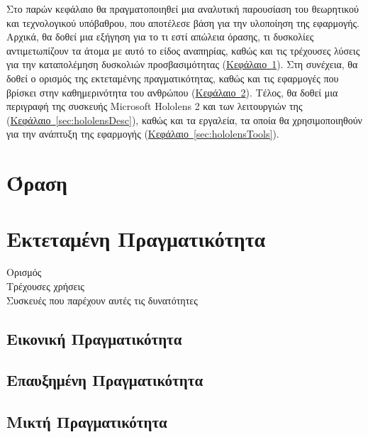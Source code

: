 
Στο παρών κεφάλαιο θα πραγματοποιηθεί μια αναλυτική παρουσίαση του θεωρητικού και τεχνολογικού υπόβαθρου, που αποτέλεσε βάση για την υλοποίηση της εφαρμογής. Αρχικά, θα δοθεί μια εξήγηση για το τι εστί απώλεια όρασης, τι δυσκολίες αντιμετωπίζουν τα άτομα με αυτό το είδος αναπηρίας, καθώς και τις τρέχουσες λύσεις για την καταπολέμηση δυσκολιών προσβασιμότητας (\hyperref[sec:visualImpairment]{Κεφάλαιο~\ref*{sec:visualImpairment}}). Στη συνέχεια, θα δοθεί ο ορισμός της εκτεταμένης πραγματικότητας, καθώς και τις εφαρμογές που βρίσκει στην καθημερινότητα του ανθρώπου (\hyperref[sec:extendedReality]{Κεφάλαιο~\ref*{sec:extendedReality}}). Τέλος, θα δοθεί μια περιγραφή της συσκευής Microsoft Hololens 2 και των λειτουργιών της (\hyperref[sec:hololensDesc]{Κεφάλαιο~\ref*{sec:hololensDesc}}), καθώς και τα εργαλεία, τα οποία θα χρησιμοποιηθούν για την ανάπτυξη της εφαρμογής (\hyperref[sec:hololensTools]{Κεφάλαιο~\ref*{sec:hololensTools}}).

\section{Όραση}\label{sec:visualImpairment}



\section{Εκτεταμένη Πραγματικότητα}\label{sec:extendedReality}
Ορισμός\\
Τρέχουσες χρήσεις\\
Συσκευές που παρέχουν αυτές τις δυνατότητες

\subsection{Εικονική Πραγματικότητα}

\subsection{Επαυξημένη Πραγματικότητα}

\subsection{Μικτή Πραγματικότητα}


